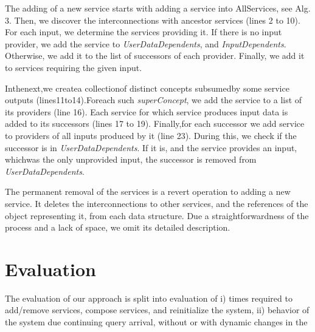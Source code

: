 \documentclass{llncs}
\begin{document}
The adding of a new service starts with adding a service into AllServices, see 
Alg. 3. Then, we discover the interconnections with ancestor services (lines 2 to 
10). For each input, we determine the services providing it. If there is no input 
provider, we add the service to \textit{UserDataDependents}, and\textit{ InputDependents}. Otherwise, 
we add it to the list of successors of each provider. Finally, we add it to 
services requiring the given input. 
\clearpage


Inthenext,we createa collectionof distinct concepts subsumedby some service 
outputs (lines11to14).Foreach such  \textit{superConcept}, we add the service to a list of 
its providers (line 16). Each service for which service produces input data is added to 
its successors (lines 17 to 19). Finally,for each successor we add service to providers 
of all inputs produced by it (line 23). During this, we check if the successor is in 
 \textit{UserDataDependents}. If it is, and the service provides an input, whichwas the only 
unprovided input, the successor is removed from  \textit{UserDataDependents}. 

The permanent removal of the services is a revert operation to adding a new 
service. It deletes the interconnections to other services, and the references of the 
object representing it, from each data structure. Due a straightforwardness of the 
process and a lack of space, we omit its detailed description. 

\section{Evaluation }


The evaluation of our approach is split into evaluation of i) times required to 
add/remove services, compose services, and reinitialize the system, ii) behavior of 
the system due continuing query arrival, without or with dynamic changes in the 



%
%
\end{document}
